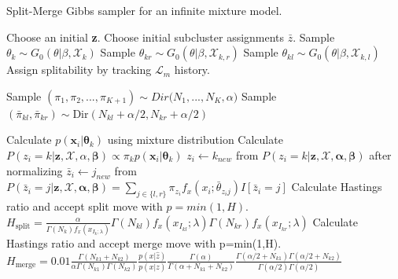 \documentclass[12pt, a4paper]{article}
\begin{document}
\begin{algorithm}[H]
  \caption{Split-Merge Gibbs sampler for an infinite  mixture model.}\label{split-mergegibbs}
  \begin{algorithmic}[1]
    
  \State Choose an initial \textbf{z}.
  \State Choose initial subcluster assignments $\bar{z}$.
   
     
            \State Sample $\theta_k \sim  G_0(\theta|\beta,\mathcal{X}_{k})$ 
            \State Sample $\theta_{kr} \sim  G_0(\theta|\beta,\mathcal{X}_{k,r})$
            \State Sample $\theta_{kl} \sim  G_0(\theta|\beta,\mathcal{X}_{k,l})$ 
            \State Assign splitability by tracking $\mathcal{L}_{m}$ history. 
    \EndFor
    
    \State Sample $ (\pi_{1}, \pi_{2},...,\pi_{K+1})  \sim Dir\big(N_1,...,N_K, \alpha \big) $
    \State Sample $(\bar{\pi}_{kl}, \bar{\pi}_{kr}) \sim \mathrm{Dir}(N_{kl}+\alpha/2, N_{kr}+\alpha/2)$
    
     
            \State Calculate $p(\mathbf{x}_i|\mathbf{\theta}_k)$ using mixture distribution
            \State Calculate $P(z_i = k | \mathbf{z},\mathcal{X},\alpha,\mathbf{\beta}) \propto \pi_k p(\mathbf{x}_i|\mathbf{\theta}_k)$
        \EndFor
        \State $z_i \gets k_{new}$ from $P(z_i = k | \mathbf{z},\mathcal{X},\mathbf{\alpha},\mathbf{\beta})$ after normalizing
        \State $\bar{z}_i \gets j_{new}$ from $P(\bar{z}_i = j | \mathbf{z},\mathcal{X},\mathbf{\alpha},\mathbf{\beta}) = \sum_{j \in \{l,r\}} \pi_{z_{i}}f_x(x_i;\bar{\theta}_{z_{i}j})I[\bar{z}_{i} = j]$ 
          
                 \State Calculate Hastings ratio and accept split move with $p=min(1,H)$.
                 \State $H_{\text {split}}=\frac{\alpha}{\Gamma\left(N_{k}\right) f_{x}\left(x_{I_{k} ; \lambda}\right)} \Gamma\left(N_{k l}\right) f_{x}\left(x_{I_{k l}} ; \lambda\right) \Gamma\left(N_{k r}\right) f_{x}\left(x_{I_{k r}} ; \lambda\right)$
             \EndIf
        \EndFor
          
             \State Calculate Hastings ratio and accept merge move with p=min(1,H).
             \State $H_{\text {merge}}=0.01 \frac{\Gamma\left(N_{k 1}+N_{k 2}\right)}{\alpha \Gamma\left(N_{k 1}\right) \Gamma\left(N_{k 2}\right)} \frac{p(x | \hat{z})}{p(x | z)} \frac{\Gamma(\alpha)}{\Gamma\left(\alpha+N_{k 1}+N_{k 2}\right)} \frac{\Gamma\left(\alpha / 2+N_{k 1}\right) \Gamma\left(\alpha / 2+N_{k 2}\right)}{\Gamma(\alpha / 2) \Gamma(\alpha / 2)}$
        \EndFor
    \EndFor
  \EndFor 
  \end{algorithmic}
\end{algorithm}
\end{document}

